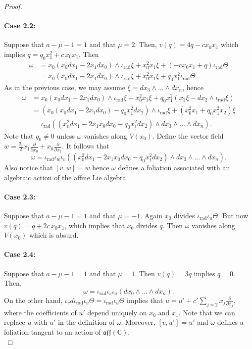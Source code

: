 \documentclass[twoside]{amsart}
\numberwithin{equation}{section}
\DeclareMathOperator{\rad}{rad}
\def\CC{{\mathbb{C}}}
\newcommand{\del}[1]{\frac{\partial}{\partial #1}}
\theoremstyle{definition}
\begin{document}
\begin{proof}
 \paragraph{\textbf{Case 2.2:}} Suppose that $a-\mu-1 = 1$ and that $\mu = 2$. Then, $v(q) = 4q -cx_0x_1$ which implies $q = q_0x_1^2 +c\,x_0x_1$. Then
 \begin{align*}
 \omega &= x_0(x_0 dx_1 - 2x_1 dx_0) \wedge \iota_{\rad}\xi + x_0^2x_1 \xi + (-cx_0x_1 + q ) \iota_{\rad}\Theta\\
 & = x_0(x_0 dx_1 - 2x_1 dx_0) \wedge \iota_{\rad}\xi + x_0^2x_1 \xi + q_0x_1^2 \iota_{\rad}\Theta
 \end{align*}
 As in the previous case, we may assume $\xi = dx_3\wedge \dots\wedge dx_n$, hence 
 \begin{align*}
 \omega &= x_0(x_0 dx_1 - 2x_1 dx_0) \wedge \iota_{\rad}\xi + x_0^2x_1 \xi + q_0x_1^2(x_2\xi -dx_2\wedge \iota_{\rad}\xi) \\
 & = (x_0(x_0 dx_1 - 2x_1 dx_0) - q_0x_1^2 dx_2)\wedge \iota_{\rad}\xi + (x_0^2x_1 + q_0x_1^2x_2)\xi \\
 & = \iota_{\rad}( ( x_0^2 dx_1 - 2x_1x_0 dx_0 - q_0x_1^2 dx_2) \wedge dx_3 \wedge \dots \wedge dx_n).
 \end{align*}
 Note that $q_0 \neq 0$ unless $\omega$ vanishes along $V(x_0)$. Define the vector field $w = \frac{q_0}{2}x_1 \del{ x_0} + x_0 \del{ x_2}$. It follows that 
 \[
 \omega = \iota_{\rad}\iota_w \iota_v ( ( x_0^2 dx_1 - 2x_1x_0 dx_0 - q_0x_1^2 dx_2) \wedge dx_3 \wedge \dots \wedge dx_n).
 \]
 Also notice that $[v,w] = w$ hence $\omega$ defines a foliation associated with an algebraic action of the affine Lie algebra.
\\
 \paragraph{\textbf{Case 2.3:}} Suppose that $a-\mu-1 = 1$ and that $\mu = -1$. Again $x_0$ divides $\iota_{\rad}\iota_u \Theta$. But now $v(q) = q + 2c\, x_0x_1$, which implies that $x_0$ divides $q$. Then $\omega$ vanishes along $V(x_0)$ which is absurd. 
 \\
 \paragraph{\textbf{Case 2.4:}}
 Suppose that $a-\mu-1 = 1$ and that $\mu = 1$. Then $v(q) = 3q$ implies $q=0$. Then, 
 \[
 \omega = \iota_{\rad}\iota_v\iota_u (dx_0\wedge \dots \wedge dx_n). 
 \]
 On the other hand, $\iota_vd\iota_{\rad}\iota_u\Theta = \iota_{\rad}\iota_u\Theta$ implies that $u = u' + c'\sum_{j= 2}x_j \del{ x_j}$, where the coefficients of $u'$ depend uniquely on $x_0$ and $x_1$. Note that we can replace $u$ with $u'$ in the definition of $\omega$. Moreover, $[v,u']=u'$ and $\omega$ defines a foliation tangent to an action of $\mathfrak{aff}(\CC)$.
 \\

\end{proof}
\end{document}
